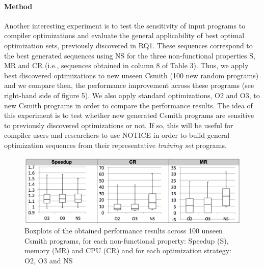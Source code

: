 \paragraph{Method}
Another interesting experiment is to test the sensitivity of input programs to compiler optimizations and evaluate the general applicability of best optimal optimization sets, previously discovered in RQ1. These sequences correspond to the best generated sequences using NS for the three non-functional properties S, MR and CR (i.e., sequences obtained in column 8 of Table 3). 
Thus, we apply best discovered optimizations to new unseen Csmith (100 new random programs) and we compare then, the performance improvement across these programs (see right-hand side of figure 5). We also apply standard optimizations, O2 and O3, to new Csmith programs in order to compare the performance results.
The idea of this experiment is to test whether new generated Csmith programs are sensitive to previously discovered optimizations or not. 
If so, this will be useful for compiler users and researchers to use NOTICE in order to build general optimization sequences from their representative \textit{training set} programs.
\vspace{-1.2em}
\begin{figure}[h]
	\centering
	\includegraphics[width=1.\linewidth]{Ressources/box.png}
	\caption{Boxplots of the obtained performance results across 100 unseen Csmith programs, for each non-functional property: Speedup (S), memory (MR) and CPU (CR) and for each optimization strategy: O2, O3 and NS}
\end{figure}
